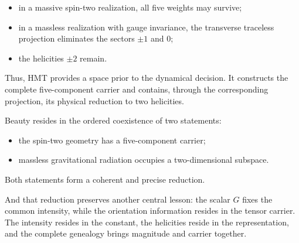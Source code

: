 \begin{itemize}[leftmargin=*,itemsep=0.35em]
\item in a massive spin-two realization, all five weights may survive;
\item in a massless realization with gauge invariance, the transverse traceless projection eliminates the sectors \(\pm1\) and \(0\);
\item the helicities \(\pm2\) remain.
\end{itemize}

Thus, HMT provides a space prior to the dynamical decision. It constructs the complete five-component carrier and contains, through the corresponding projection, its physical reduction to two helicities.\par

Beauty resides in the ordered coexistence of two statements:\par

\begin{itemize}[leftmargin=*,itemsep=0.35em]
\item the spin-two geometry has a five-component carrier;
\item massless gravitational radiation occupies a two-dimensional subspace.
\end{itemize}

Both statements form a coherent and precise reduction.\par

And that reduction preserves another central lesson: the scalar \(G\) fixes the common intensity, while the orientation information resides in the tensor carrier. The intensity resides in the constant, the helicities reside in the representation, and the complete genealogy brings magnitude and carrier together.\par

